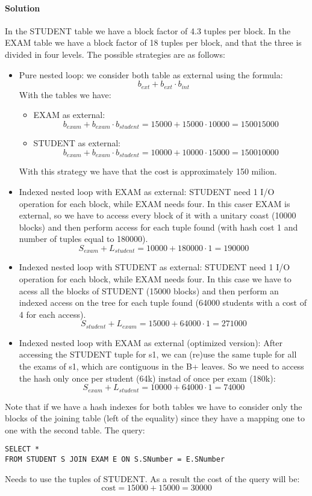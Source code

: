\paragraph*{Solution}
In the STUDENT table we have a block factor of 4.3 tuples per block. 
In the EXAM table we have a block factor of 18 tuples per block, and that the three is divided in four levels. 
The possible strategies are as follows: 
\begin{itemize}
    \item Pure nested loop: we consider both table as external using the formula: 
        \[b_{ext}+b_{ext}\cdot b_{int}\]
        With the tables we have: 
        \begin{itemize}
            \item EXAM as external: 
                \[b_{exam}+b_{exam}\cdot b_{student}=15000+15000\cdot 10000=150015000\]
            \item STUDENT as external: 
                \[b_{exam}+b_{exam}\cdot b_{student}=10000+10000\cdot 15000=150010000\]
        \end{itemize}
        With this strategy we have that the cost is approximately 150 milion. 
    \item Indexed nested loop with EXAM as external: 
        STUDENT need 1 I/O operation for each block, while EXAM needs four. 
        In this caser EXAM is external, so we have to access every block of it with a unitary coast (10000 blocks) and then perform access for each tuple found (with hash cost 1 and number of tuples equal to 180000).
        \[S_{exam}+L_{student}=10000+180000 \cdot 1=190000\]
    \item Indexed nested loop with STUDENT as external: 
        STUDENT need 1 I/O operation for each block, while EXAM needs four. 
        In this case we have to acess all the blocks of STUDENT (15000 blocks) and then perform an indexed access on the tree for each tuple found (64000 students with a cost of 4 for each access). 
        \[S_{student}+L_{exam}=15000+64000 \cdot 1=271000\]
    \item Indexed nested loop with EXAM as external (optimized version): 
        After accessing the STUDENT tuple for s1, we can (re)use the same tuple for all the exams of s1, which are contiguous in the B+ leaves. 
        So we need to access the hash only once per student (64k) instad of once per exam (180k): 
        \[S_{exam}+L_{student}=10000+64000 \cdot 1=74000\]
\end{itemize}
Note that if we have a hash indexes for both tables we have to consider only the blocks of the joining table (left of the equality) since they have a mapping one to one with the second table. 
The query: 
\begin{lstlisting}[style=SQL]
SELECT *
FROM STUDENT S JOIN EXAM E ON S.SNumber = E.SNumber 
\end{lstlisting}
Needs to use the tuples of STUDENT. 
As a result the cost of the query will be: 
\[\text{cost}=15000+15000=30000\]